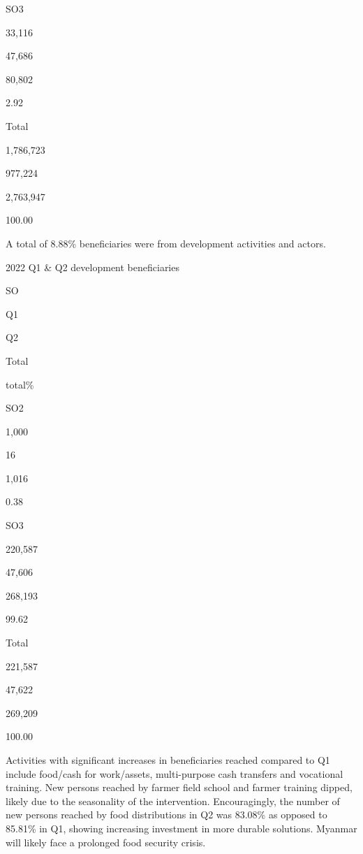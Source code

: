 \documentclass[
]{article}
\begin{document}
SO3

33,116

47,686

80,802

2.92

Total

1,786,723

977,224

2,763,947

100.00

A total of 8.88\% beneficiaries were from development activities and
actors.

2022 Q1 \& Q2 development beneficiaries

SO

Q1

Q2

Total

total\%

SO2

1,000

16

1,016

0.38

SO3

220,587

47,606

268,193

99.62

Total

221,587

47,622

269,209

100.00

Activities with significant increases in beneficiaries reached compared
to Q1 include food/cash for work/assets, multi-purpose cash transfers
and vocational training. New persons reached by farmer field school and
farmer training dipped, likely due to the seasonality of the
intervention. Encouragingly, the number of new persons reached by food
distributions in Q2 was 83.08\% as opposed to 85.81\% in Q1, showing
increasing investment in more durable solutions. Myanmar will likely
face a prolonged food security crisis.
\end{document}
